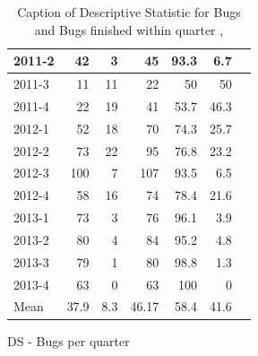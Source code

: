 \documentclass[UKenglish]{ifimaster}  %
\begin{document}
\begin{appendices}
\begin{table}[!htbp]
\begin{adjustwidth}{-1.5cm}{}
\begin{subfigure}[b]{0.4\textwidth}
{\begin{tabular}{ | l | r | r | r | r | r | r | }
2011-2 & 42 & 3 & 45 & 93.3 & 6.7 \\ \hline
2011-3 & 11 & 11 & 22 & 50 & 50 \\ \hline
2011-4 & 22 & 19 & 41 & 53.7 & 46.3 \\ \hline
2012-1 & 52 & 18 & 70 & 74.3 & 25.7 \\ \hline
2012-2 & 73 & 22 & 95 & 76.8 & 23.2 \\ \hline
2012-3 & 100 & 7 & 107 & 93.5 & 6.5 \\ \hline
2012-4 & 58 & 16 & 74 & 78.4 & 21.6 \\ \hline
2013-1 & 73 & 3 & 76 & 96.1 & 3.9 \\ \hline
2013-2 & 80 & 4 & 84 & 95.2 & 4.8 \\ \hline
2013-3 & 79 & 1 & 80 & 98.8 & 1.3 \\ \hline
2013-4 & 63 & 0 & 63 & 100 & 0 \\ \hline
Mean & 37.9 & 8.3 & 46.17 & 58.4& 41.6 \\ \hline
\end{tabular}
}
\caption{DS - Bugs per quarter}
 \label{DS:FTPQ:9}
\end{subfigure}
\end{adjustwidth}
\caption[Optional caption for list of figures]{Caption of Descriptive Statistic for Bugs and Bugs finished within quarter  , }
\label{DS:9:5} %
\end{table}


\end{appendices}
\end{document}
